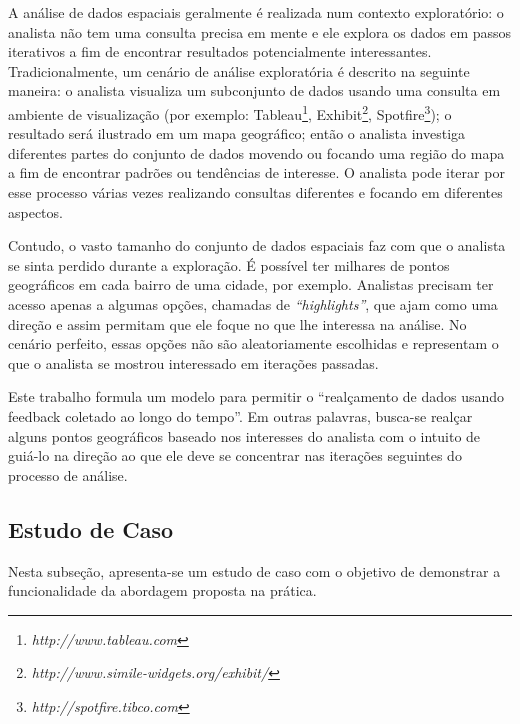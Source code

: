 A análise de dados espaciais geralmente é realizada num contexto exploratório: o analista não tem uma consulta precisa em mente e ele explora os dados em passos iterativos a fim de encontrar resultados potencialmente interessantes. Tradicionalmente, um cenário de análise exploratória é descrito na seguinte maneira: o analista visualiza um subconjunto de dados usando uma consulta em ambiente de visualização (por exemplo: Tableau\footnote{\it http://www.tableau.com},
Exhibit\footnote{\it http://www.simile-widgets.org/exhibit/},
Spotfire\footnote{\it http://spotfire.tibco.com}); o resultado será ilustrado em um mapa geográfico; então o analista investiga diferentes partes do conjunto de dados movendo ou focando uma região do mapa a fim de encontrar padrões ou tendências de interesse. O analista pode iterar por esse processo várias vezes realizando consultas diferentes e focando em diferentes aspectos.

Contudo, o vasto tamanho do conjunto de dados espaciais faz com que o analista se sinta perdido durante a exploração. É possível ter milhares de pontos geográficos em cada bairro de uma cidade, por exemplo. Analistas precisam ter acesso apenas a algumas opções, chamadas de {\em ``highlights''}, que ajam como uma direção e assim permitam que ele foque no que lhe interessa na análise. No cenário perfeito, essas opções não são aleatoriamente escolhidas e representam o que o analista se mostrou interessado em iterações passadas.

Este trabalho formula um modelo para permitir o ``realçamento de dados usando feedback coletado ao longo do tempo''. Em outras palavras, busca-se realçar alguns pontos geográficos baseado nos interesses do analista com o intuito de guiá-lo na direção ao que ele deve se concentrar nas iterações seguintes do processo de análise.

\subsection{Estudo de Caso}

Nesta subseção, apresenta-se um estudo de caso com o objetivo de demonstrar a funcionalidade da abordagem proposta na prática.

